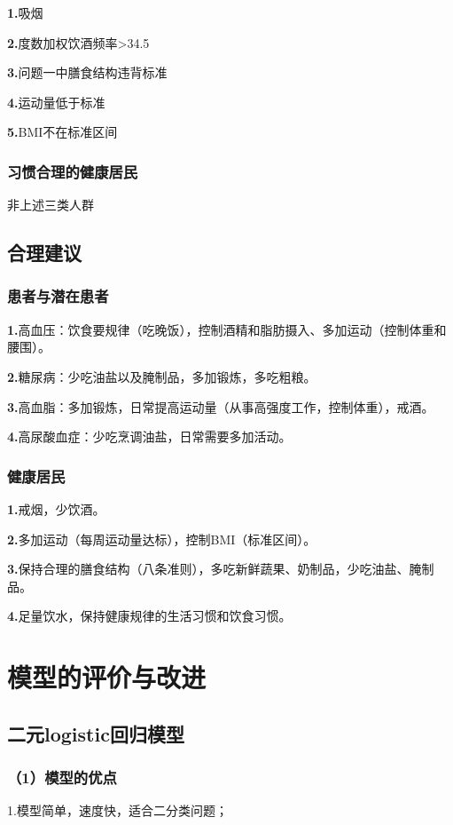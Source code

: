 \documentclass{article}
\numberwithin{equation}{subsection}
\begin{document}
\textbf{1.}吸烟

\textbf{2.}度数加权饮酒频率>34.5

\textbf{3.}问题一中膳食结构违背标准

\textbf{4.}运动量低于标准

\textbf{5.}BMI不在标准区间

\subsubsection{习惯合理的健康居民}
非上述三类人群

\subsection{合理建议}
\subsubsection{患者与潜在患者}

\textbf{1.}高血压：饮食要规律（吃晚饭），控制酒精和脂肪摄入、多加运动（控制体重和腰围）。

\textbf{2.}糖尿病：少吃油盐以及腌制品，多加锻炼，多吃粗粮。

\textbf{3.}高血脂：多加锻炼，日常提高运动量（从事高强度工作，控制体重），戒酒。

\textbf{4.}高尿酸血症：少吃烹调油盐，日常需要多加活动。

\subsubsection{健康居民}
\textbf{1.}戒烟，少饮酒。

\textbf{2.}多加运动（每周运动量达标），控制BMI（标准区间）。

\textbf{3.}保持合理的膳食结构（八条准则），多吃新鲜蔬果、奶制品，少吃油盐、腌制品。

\textbf{4.}足量饮水，保持健康规律的生活习惯和饮食习惯。

{\centering\section{模型的评价与改进}}

\subsection{二元logistic回归模型}
\subsubsection*{（1）模型的优点}
1.模型简单，速度快，适合二分类问题；
\end{document}

